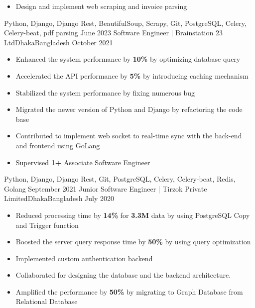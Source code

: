 \begin{experiences}
{\begin{itemize}
                        \item Design and implement web scraping and invoice parsing
                      \end{itemize}
                    }
                    {Python, Django, Django Rest, BeautifulSoup, Scrapy, Git, PostgreSQL, Celery, Celery-beat, pdf parsing}
  \emptySeparator
  \experience
    {June 2023}   {Software Engineer | Brainstation 23 Ltd}{Dhaka}{Bangladesh}
    {October 2021} {
                     \begin{itemize}
                       \item Enhanced the system performance by \textbf{10\%} by optimizing database query
                       \item Accelerated the API performance by \textbf{5\%} by introducing caching mechanism
                       \item Stabilized the system performance by fixing numerous bug
                        \item Migrated the newer version of Python and Django by refactoring the code base
                        \item Contributed to implement web socket to real-time sync with the back-end and frontend using GoLang
                        \item Supervised \textbf{1+} Associate Software Engineer
                      \end{itemize}
                    }
                    {Python, Django, Django Rest, Git, PostgreSQL, Celery, Celery-beat, Redis, Golang}
  \emptySeparator
  \experience
    {September 2021} {Junior Software Engineer | Tirzok Private Limited}{Dhaka}{Bangladesh}
    {July 2020}    {
                      \begin{itemize}
                           \item Reduced processing time by \textbf{14\%} for \textbf{3.3M} data by using PostgreSQL Copy and Trigger function
                           \item Boosted the server query response time by \textbf{50\%} by using query optimization
                           \item Implemented custom authentication backend
                           \item Collaborated for designing the database and the backend architecture.
                           \item Amplified the performance by \textbf{50\%} by migrating to Graph Database from Relational Database

\end{itemize}}
\end{experiences}
